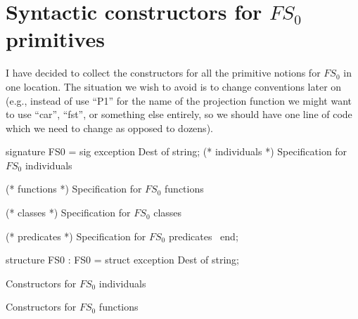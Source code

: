 
\section{Syntactic constructors for $FS_{0}$ primitives}

\begin{node}
I have decided to collect the constructors for all the primitive
notions for $FS_{0}$ in one location. The situation we wish to avoid
is to change conventions later on (e.g., instead of use ``P1'' for the
name of the projection function we might want to use ``car'', ``fst'',
or something else entirely, so we should have one line of code which we
need to change as opposed to dozens).
\end{node}

\nwenddocs{}\endmoddef\nwstartdeflinemarkup\nwenddeflinemarkup
signature FS0 = sig
  exception Dest of string;
  (* individuals *)
  \LA{}Specification for $FS_{0}$ individuals~{\nwtagstyle{}}\RA{}

  (* functions *)
  \LA{}Specification for $FS_{0}$ functions~{\nwtagstyle{}}\RA{}

  (* classes *)
  \LA{}Specification for $FS_{0}$ classes~{\nwtagstyle{}}\RA{}

  (* predicates *)
  \LA{}Specification for $FS_{0}$ predicates~{\nwtagstyle{}}\RA{}
end;
\nwendcode{}\nwdocspar

\nwenddocs{}\endmoddef\nwstartdeflinemarkup\nwenddeflinemarkup
structure FS0 : FS0 = struct
exception Dest of string;

\LA{}Constructors for $FS_{0}$ individuals~{\nwtagstyle{}}\RA{}

\LA{}Constructors for $FS_{0}$ functions~{\nwtagstyle{}}\RA{}

